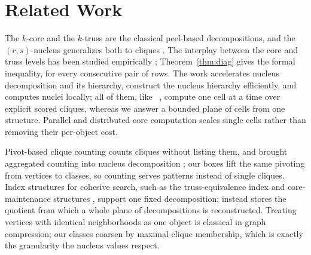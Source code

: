 \section{Related Work}\label{sec:related}
The $k$-core \cite{seidman1983network,batagelj2011fast} and the $k$-truss \cite{cohen2008trusses,wang2012truss,huang2014truss,burkhardt2020trusses} are the classical peel-based decompositions, and the $(r,s)$-nucleus generalizes both to cliques \cite{firstNucleus}.
%
The interplay between the core and truss levels has been studied empirically \cite{liu2020interplay}; Theorem~\ref{thm:diag} gives the formal inequality, for every consecutive pair of rows.
%
The work \cite{sotaPrveHierarchy} accelerates nucleus decomposition and its hierarchy, \cite{fastHierarchy,sotaHierarchy} construct the nucleus hierarchy efficiently, and \cite{LocalNuclear} computes nuclei locally; all of them, like \cnd~\cite{NuclearCD}, compute one cell at a time over explicit scored cliques, whereas we answer a bounded plane of cells from one structure.
%
Parallel and distributed core computation \cite{montresor2013distributed} scales single cells rather than removing their per-object cost.

Pivot-based clique counting \cite{Pivoter,BronKerbosch,bitsetClique} counts cliques without listing them, and \cnd{} brought aggregated counting into nucleus decomposition \cite{NuclearCD}; our boxes lift the same pivoting from vertices to classes, so counting serves patterns instead of single cliques.
%
Index structures for cohesive search, such as the truss-equivalence index \cite{akbas2017truss} and core-maintenance structures \cite{zhang2023efficient}, support one fixed decomposition; \nsi{} instead stores the quotient from which a whole plane of decompositions is reconstructed.
%
Treating vertices with identical neighborhoods as one object is classical in graph compression; our classes coarsen by maximal-clique membership, which is exactly the granularity the nucleus values respect.
